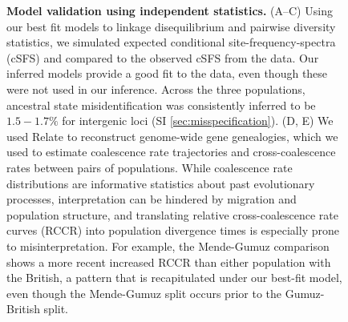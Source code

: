 \documentclass[]{article}
\begin{document}
\begin{figure}[t!]
    \centering
    \caption{
        \textbf{Model validation using independent statistics.} (A--C) Using
        our best fit models to linkage disequilibrium and pairwise diversity statistics,
        we simulated expected conditional site-frequency-spectra (cSFS) and
        compared to the observed cSFS from the data. Our inferred models
        provide a good fit to the data, even though these were not used in our
        inference. Across the three populations, ancestral state
        misidentification was consistently inferred to be $1.5-1.7\%$ for
        intergenic loci (SI \ref{sec:misspecification}). (D, E) We used Relate
        \citep{Speidel2019-nj} to reconstruct genome-wide gene genealogies,
        which we used to estimate coalescence rate trajectories
        and cross-coalescence rates between pairs of populations. While
        coalescence rate distributions are informative statistics about past
        evolutionary processes, interpretation can be hindered by migration and
        population structure, and translating relative cross-coalescence rate
        curves (RCCR) into population divergence times is especially prone
        to misinterpretation. For example, the Mende-Gumuz comparison shows
        a more recent increased RCCR than either population with the British,
        a pattern that is recapitulated under our best-fit model, even though
        the Mende-Gumuz split occurs prior to the Gumuz-British split.
    }
    \label{fig:validation}
\end{figure}
\end{document}
